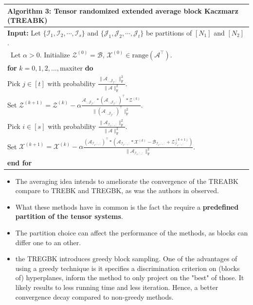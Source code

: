 \documentclass[aspectratio=169]{beamer}
\begin{document}
\begin{frame}[t]{}
\scriptsize
\setlength{\tabcolsep}{2pt}
\renewcommand{\arraystretch}{1.05}
\begin{center}
\begin{tabular*}{\linewidth}{@{\extracolsep{\fill}}l@{}}
\toprule
{\bf Algorithm 3:} Tensor  randomized  extended  average block Kaczmarz (TREABK)\\
\midrule
{\bf Input:} Let $\{\mathcal{I}_1, \mathcal{I}_2, \cdots, \mathcal{I}_s\}$ and $\{\mathcal{J}_1, \mathcal{J}_2, \cdots, \mathcal{J}_t\}$ be partitions of $[N_1]$ and $[N_2]$.\\
\quad\quad\, Let $\alpha > 0$. Initialize $\mathcal{Z}^{(0)} = \mathcal{B}$, $\mathcal{X}^{(0)} \in \text{range}(\mathcal{A}^\top)$.\\
{\bf for} $k=0,1,2,\ldots,\text{maxiter}$ {\bf do}\\
\quad Pick $j \in [t]$ with probability $\displaystyle\frac{\|\mathcal{A}_{:,\mathcal{J}_j,:}\|_{\text{F}}^2}{\|\mathcal{A}\|_{\text{F}}^2}$.\\[8pt]
\quad Set $\displaystyle\mathcal{Z}^{(k+1)} = \mathcal{Z}^{(k)} - \alpha\frac{\mathcal{A}_{:,\mathcal{J}_j,:}*(\mathcal{A}_{:,\mathcal{J}_j,:})^\top * \mathcal{Z}^{(k)}}{\|(\mathcal{A}_{:,\mathcal{J}_j,:})^\top\|_{\text{F}}^2}$.\\[8pt]
\quad Pick $i \in [s]$ with probability $\displaystyle\frac{\|\mathcal{A}_{\mathcal{I}_i,:,:}\|_{\text{F}}^2}{\|\mathcal{A}\|_{\text{F}}^2}$.\\[8pt]
\quad Set $\displaystyle\mathcal{X}^{(k+1)} = \mathcal{X}^{(k)} - \alpha\frac{(\mathcal{A}_{\mathcal{I}_i,:,:})^\top * (\mathcal{A}_{\mathcal{I}_i,:,:}*\mathcal{X}^{(k)} - \mathcal{B}_{\mathcal{I}_i,:,:} + \mathcal{Z}_{\mathcal{I}_i,:,:}^{(k+1)})}{\|\mathcal{A}_{\mathcal{I}_i,:,:}\|_{\text{F}}^2}$.\\[4pt]
{\bf end for}\\
\bottomrule
\end{tabular*}
\end{center}
\end{frame}

\begin{frame}{}
\begin{itemize}
    \item The averaging idea intends to ameliorate the convergence of the TREABK compare to TREBK and TREGBK, as was the authors in \cite{an2025randomized} observed.
    \item What these methods have in common is the fact the require a  \textbf{predefined partition of the tensor systems}.
    \item The partition choice can affect the performance of the methods, as blocks can differ one to an other.
    \item the TREGBK introduces greedy block sampling. One of the advantages of using a greedy technique is it specifies a discrimination criterion on (blocks of) hyperplanes, inform the method to only project on the "best" of those. It likely results to less running time and less iteration. Hence, a better convergence decay \cite{bai2018greedy, bai2021greedy} compared to non-greedy methods.
\end{itemize}
\end{frame}
\end{document}
